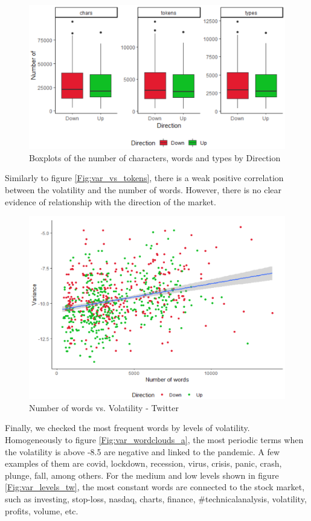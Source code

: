 \documentclass[a4paper, 12pt]{report}
\begin{document}
    
    \begin{figure}[H]
    \centering
    \includegraphics[scale=0.7]{graphs/Twitter/Boxplots_EDA.png}
    \caption{Boxplots of the number of characters, words and types by Direction}
    \label{Fig:Boxplots_EDA}
    \end{figure}
    
    Similarly to figure \ref{Fig:var_vs_tokens}, there is a weak positive correlation between the volatility and the number of words. However, there is no clear evidence of relationship with the direction of the market.

    \begin{figure}[H]
    \centering
    \includegraphics[scale=0.75]{graphs/Twitter/var_vs_tokens.png}
    \caption{Number of words vs. Volatility - Twitter}
    \label{Fig:Scatter_twt}
    \end{figure}
    
    
    Finally, we checked the most frequent words by levels of volatility. Homogeneously to figure \ref{Fig:var_wordclouds_a}, the most periodic terms when the volatility is above -8.5 are negative and linked to the pandemic. A few examples of them are covid, lockdown, recession, virus, crisis, panic, crash, plunge, fall, among others. For the medium and low levels shown in figure \ref{Fig:var_levels_tw}, the most constant words are connected to the stock market, such as investing, stop-loss, nasdaq, charts, finance, {\#}technicalanalysis, volatility, profits, volume, etc.
    
\end{document}
